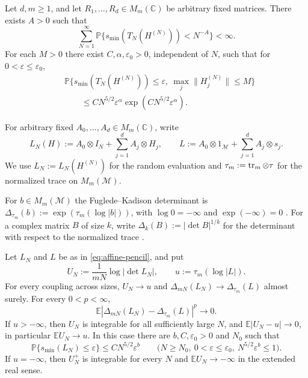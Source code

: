 \begin{theorem}\label{thm:pencil}
Let $d,m\ge 1$, and let $R_1,\ldots,R_d\in M_m(\mathbb C)$ be arbitrary fixed matrices.
There exists $A>0$ such that
\begin{equation}\label{eq:pencil-floor}
 \sum_{N=1}^{\infty}\mathbb P\{s_{\min}(T_N(H^{(N)}))<N^{-A}\}<\infty .
\end{equation}
For each $M>0$ there exist $C,\alpha,\varepsilon_0>0$, independent of $N$, such that for $0<\varepsilon\le\varepsilon_0$,
\begin{equation}\label{eq:pencil-bound}
 \begin{split}
 &\mathbb P\{s_{\min}(T_N(H^{(N)}))\le\varepsilon,\
                \max_j\|H_j^{(N)}\|\le M\}\\
 &\hspace{2em}\le C N^{5/2}\varepsilon^\alpha
                  \exp(CN^{5/2}\varepsilon^\alpha).
 \end{split}
\end{equation}
\end{theorem}

For arbitrary fixed $A_0,\ldots,A_d\in M_m(\mathbb C)$, write
\begin{equation}\label{eq:affine-pencil}
 L_N(H):=A_0\otimes I_N+\sum_{j=1}^d A_j\otimes H_j,\qquad
 L:=A_0\otimes 1_{\mathcal M}+\sum_{j=1}^d A_j\otimes s_j .
\end{equation}
We use $L_N:=L_N(H^{(N)})$ for the random evaluation and $\tau_m:=\operatorname{tr}_m\otimes\tau$ for the normalized trace on $M_m(\mathcal M)$.

\begin{definition}\label{def:fk-determinant}
For $b\in M_m(\mathcal M)$ the Fuglede--Kadison determinant is $\Delta_{\tau_m}(b):=\exp(\tau_m(\log|b|))$, with $\log 0=-\infty$ and $\exp(-\infty)=0$ \cite[Definition~2.1(ii) and Remark~2.2(i)]{MS24}.
For a complex matrix $B$ of size $k$, write $\Delta_k(B):=|\det B|^{1/k}$ for the determinant with respect to the normalized trace \cite[Proposition~2.3(vi)]{MS24}.
\end{definition}

\begin{theorem}\label{thm:affine}
Let $L_N$ and $L$ be as in \eqref{eq:affine-pencil}, and put
\[
 U_N:=\frac{1}{mN}\log|\det L_N|,\qquad
 u:=\tau_m(\log|L|).
\]
For every coupling across sizes, $U_N\to u$ and $\Delta_{mN}(L_N)\to\Delta_{\tau_m}(L)$ almost surely.
For every $0<p<\infty$,
\[
 \mathbb E|\Delta_{mN}(L_N)-\Delta_{\tau_m}(L)|^p\longrightarrow 0.
\]
If $u>-\infty$, then $U_N$ is integrable for all sufficiently large $N$, and $\mathbb E|U_N-u|\to0$, in particular $\mathbb E U_N\to u$.
In this case there are $b,C,\varepsilon_0>0$ and $N_0$ such that
\begin{equation}\label{eq:global-floor}
 \mathbb P\{s_{\min}(L_N)\le\varepsilon\}\le C N^{5/2}\varepsilon^b
 \qquad
 \bigl(N\ge N_0,\ 0<\varepsilon\le\varepsilon_0,\ N^{5/2}\varepsilon^b\le1\bigr).
\end{equation}
If $u=-\infty$, then $U_N^+$ is integrable for every $N$ and $\mathbb E U_N\to-\infty$ in the extended real sense.
\end{theorem}

